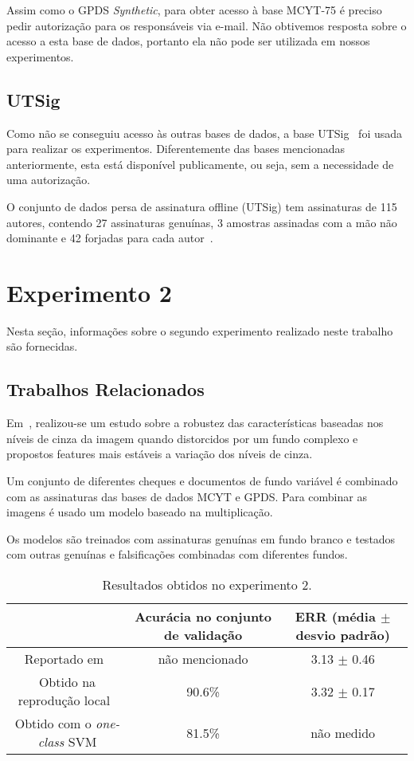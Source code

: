 \documentclass[11pt, twocolumn, a4paper]{article}
\begin{document}
Assim como o GPDS {\it Synthetic}, para obter acesso à base MCYT-75 é preciso pedir autorização para os responsáveis via e-mail. Não obtivemos resposta sobre o acesso a esta base de dados, portanto ela não pode ser utilizada em nossos experimentos.

\subsection{UTSig}

Como não se conseguiu acesso às outras bases de dados, a base UTSig~\cite{utsig} foi usada para realizar os experimentos. Diferentemente das bases mencionadas anteriormente, esta está disponível publicamente, ou seja, sem a necessidade de uma autorização.

O conjunto de dados persa de assinatura offline (UTSig) tem assinaturas de 115 autores, contendo 27 assinaturas genuínas, 3 amostras assinadas com a mão não dominante e 42 forjadas para cada autor~\cite{utsig}.

\section{Experimento 2}

Nesta seção, informações sobre o segundo experimento realizado neste trabalho são fornecidas.

\subsection{Trabalhos Relacionados}

Em~\cite{checks paper}, realizou-se um estudo sobre a robustez das características baseadas nos níveis de cinza da imagem quando distorcidos por um fundo complexo e propostos features mais estáveis a variação dos níveis de cinza.

Um conjunto de diferentes cheques e documentos de fundo variável é combinado com as assinaturas das bases de dados MCYT e GPDS. Para combinar as imagens é usado um modelo baseado na multiplicação.

Os modelos são treinados com assinaturas genuínas em fundo branco e testados com outras genuínas e falsificações combinadas com diferentes fundos.

\begin{table*}[!htb]
\setlength{\tabcolsep}{1mm}
\centering
\caption{Resultados obtidos no experimento 2.}
\label{resultados exp2}
\begin{tabular}{ccc}
\toprule
 & Acurácia no conjunto de validação & ERR (média $\pm$ desvio padrão) \\
\midrule
Reportado em~\cite{hafemann2} & não mencionado & 3.13 $ \pm$ 0.46 \\
Obtido na reprodução local~\cite{hafemann2} & 90.6\% & 3.32 $\pm$ 0.17 \\
Obtido com o {\it one-class} SVM & 81.5\% & não medido \\
\bottomrule
\end{tabular}
\end{table*}
\end{document}
